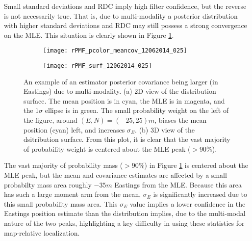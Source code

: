 Small standard deviations and RDC imply high filter confidence, but the reverse is not necessarily true. 
That is, due to multi-modality a posterior distribution with higher standard deviations and RDC may still possess a strong convergence on the MLE. 
This situation is clearly shown in Figure \ref{fig:multiModalEx}.

\begin{figure}[!h]
	\centering
	\begin{subfigure}[b]{0.48\textwidth}
                \texttt{[image: rPMF\_pcolor\_meancov\_12062014\_025]}
                \caption{}
  	\end{subfigure}
  	\hspace{2ex}
  	\centering
	\begin{subfigure}[b]{0.48\textwidth}
                \texttt{[image: rPMF\_surf\_12062014\_025]}
                \caption{}
  	\end{subfigure}
	\caption{An example of an estimator posterior covariance being larger (in Eastings) due to multi-modality. (a) 2D view of the distribution surface. The mean position is in cyan, the MLE is in magenta, and the $1\sigma$ ellipse is in green.  The small probability weight on the left of the figure, around $(E,N) = (-25, 25)m$, biases the mean position (cyan) left, and increases $\sigma_E$. (b) 3D view of the dsitribution surface.  From this plot, it is clear that the vast majority of probability weight is centered about the MLE peak ($>90\%$).}	
	\label{fig:multiModalEx}
\end{figure}

The vast majority of probability mass ($>90\%$) in Figure \ref{fig:multiModalEx} is centered about the MLE peak, but the mean and covariance estimates are affected by a small probabilty mass area roughly $-35m$ Eastings from the MLE.  
Because this area has such a large moment arm from the mean, $\sigma_E$ is significantly increased due to this small probability mass area.
This $\sigma_E$ value implies a lower confidence in the Eastings position estimate than the distribution implies, due to the multi-modal nature of the two peaks, highlighting a key difficulty in using these statistics for map-relative localization.

%
